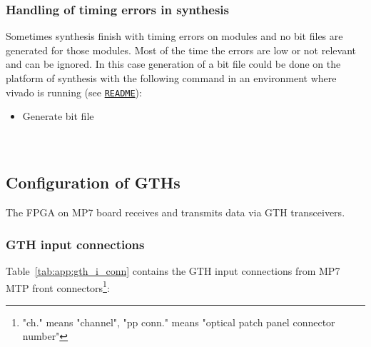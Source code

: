 \subsubsection{Handling of timing errors in synthesis}\label{sec:app:synth_timing_errors}

Sometimes synthesis finish with timing errors on modules and no bit files are generated for those modules.
Most of the time the errors are low or not relevant and can be ignored. In this case generation
of a bit file could be done on the platform of synthesis with the following command in an environment where
vivado is running (see \href{\gitbranch/README.md}{\texttt{README}}):\\
\begin{itemize}
\item Generate bit file\\
\\
\\
\end{itemize}

\clearpage

\subsection{Configuration of GTHs}\label{sec:app:app_a}

The FPGA on MP7 board receives and transmits data via GTH transceivers.\\

\subsubsection{GTH input connections}\label{sec:app:gth_i_conn}

Table~\ref{tab:app:gth_i_conn} contains the GTH input connections from MP7 MTP front connectors\footnote{"ch." means "channel", "pp conn." means "optical patch panel connector number"}:

